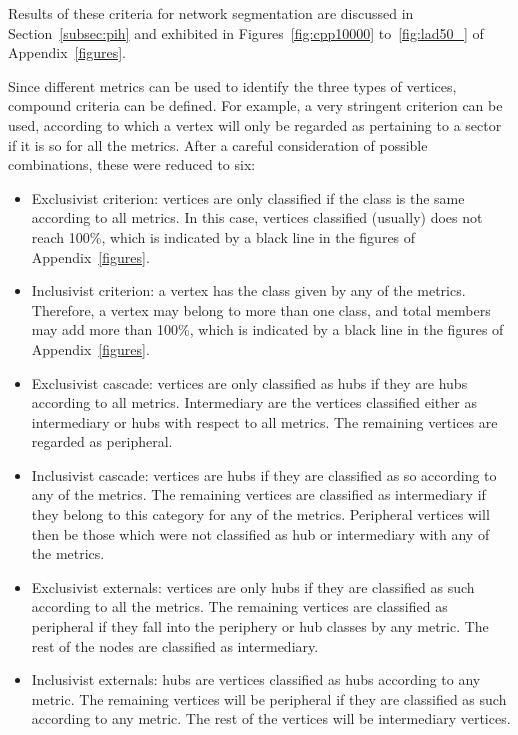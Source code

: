 \documentclass[%
 aip,
 jmp,%
 amsmath,amssymb,
 reprint,%
]{revtex4-1}
\begin{document}
Results of these criteria for network segmentation are discussed in Section~\ref{subsec:pih} and exhibited in Figures~\ref{fig:cpp10000} to~\ref{fig:lad50_} of Appendix~\ref{figures}.

Since different metrics can be used to identify the three types of vertices, compound criteria can be defined. For example, a very stringent criterion can be used, according to which a vertex will only be regarded as pertaining to a sector if it is so for all the metrics. After a careful consideration of possible combinations, these were reduced to six:

\begin{itemize}
    \item Exclusivist criterion:  vertices are only classified if the class is the same according to all metrics. In this case, vertices classified (usually) does not reach 100\%, which is indicated by a black line in the figures of Appendix~\ref{figures}.
    \item Inclusivist criterion: a vertex has the class given by any of the metrics. Therefore, a vertex may belong to more than one class, and total members may add more than 100\%, which is indicated by a black line in the figures of Appendix~\ref{figures}.
    \item Exclusivist cascade: vertices are only classified as hubs if they are hubs according to all metrics. Intermediary are the vertices classified either as intermediary or hubs with respect to all metrics. The remaining vertices are regarded as peripheral.
    \item Inclusivist cascade: vertices are hubs if they are classified as so according to any of the metrics. The remaining vertices are classified as intermediary if they belong to this category for any of the metrics. Peripheral vertices will then be those which were not classified as hub or intermediary with any of the metrics. 
    \item Exclusivist externals: vertices are only hubs if they are classified as such according to all the metrics. The remaining vertices are classified as peripheral if they fall into the periphery or hub classes by any metric. The rest of the nodes are classified as intermediary.
    \item Inclusivist externals: hubs are vertices classified as hubs according to any metric. The remaining vertices will be peripheral if they are classified as such according to any metric. The rest of the vertices will be intermediary vertices.
\end{itemize}
\end{document}
